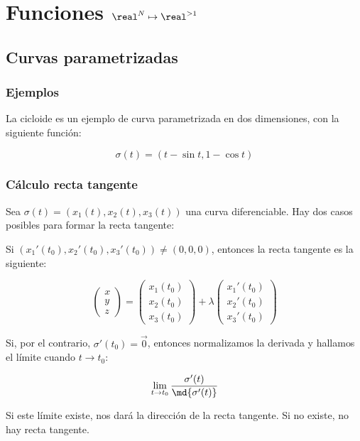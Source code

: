 \documentclass[12pt,a4paper,titlepage]{apuntes}
\begin{document}
\section{Funciones $\real^N \mapsto \real^{>1}$}

\subsection{Curvas parametrizadas}
\subsubsection{Ejemplos}

La cicloide es un ejemplo de curva parametrizada en dos dimensiones, con la siguiente función:

\[ \sigma(t) = (t - \sin t, 1 - \cos t) \]


\subsubsection{Cálculo recta tangente}
Sea $\sigma (t) = (x_1 (t),x_2(t), x_3(t))$ una curva diferenciable. Hay dos casos posibles para formar la recta tangente:

Si $ (x_1' (t_0),x_2'(t_0), x_3'(t_0))≠ (0,0,0)$, entonces la recta tangente es la siguiente:

\[ \begin{pmatrix}x \\ y \\ z\end{pmatrix} = \begin{pmatrix}x_1(t_0) \\ x_2(t_0) \\ x_3(t_0)\end{pmatrix} + \lambda \begin{pmatrix}x_1'(t_0) \\ x_2'(t_0) \\ x_3'(t_0)\end{pmatrix} \]

Si, por el contrario, $\sigma'(t_0) = \vec{0}$, entonces normalizamos la derivada y hallamos el límite cuando $t\to t_0$:

\[ \lim_{t\to t_0} \frac{\sigma'(t)}{\md{\sigma'(t)}} \]

Si este límite existe, nos dará la dirección de la recta tangente. Si no existe, no hay recta tangente.
\end{document}
